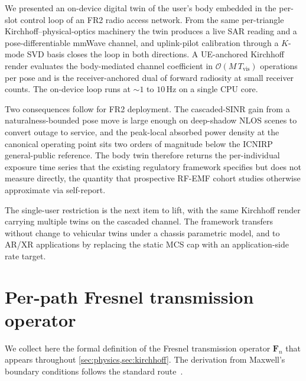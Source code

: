 \documentclass[journal,twocolumn,10pt]{IEEEtran}
\theoremstyle{plain}
\theoremstyle{definition}
\theoremstyle{remark}
\newcommand{\Fn}{\mathbf{F}_n}
\begin{document}
We presented an on-device digital twin of the user's body
embedded in the per-slot control loop of an FR2 radio access
network. From the same per-triangle Kirchhoff--physical-optics
machinery the twin produces a live SAR reading and a
pose-differentiable mmWave channel, and uplink-pilot calibration
through a $K$-mode SVD basis closes the loop in both directions.
A UE-anchored Kirchhoff render evaluates the body-mediated
channel coefficient in $\mathcal{O}(M\,T_{\mathrm{vis}})$
operations per pose and is the receiver-anchored dual of forward
radiosity at small receiver counts. The on-device loop runs at
$\sim\!1$ to $10\,$Hz on a single CPU core.

Two consequences follow for FR2 deployment. The cascaded-SINR
gain from a naturalness-bounded pose move is large enough on
deep-shadow NLOS scenes to convert outage to service, and the
peak-local absorbed power density at the canonical operating
point sits two orders of magnitude below the ICNIRP
general-public reference. The body twin therefore returns the
per-individual exposure time series that the existing
regulatory framework specifies but does not measure directly,
the quantity that prospective RF-EMF cohort studies otherwise
approximate via self-report.

The single-user restriction is the next item to lift, with the
same Kirchhoff render carrying multiple twins on the cascaded
channel. The framework transfers without change to vehicular
twins under a chassis parametric model, and to AR/XR
applications by replacing the static MCS cap with an
application-side rate target.


\appendices
\section{Per-path Fresnel transmission operator}\label{app:fresnel}

We collect here the formal definition of the Fresnel transmission
operator $\Fn$ that appears throughout
\cref{sec:physics,sec:kirchhoff}. The derivation from Maxwell's
boundary conditions follows the standard route~\cite{BornWolf}.
\end{document}
